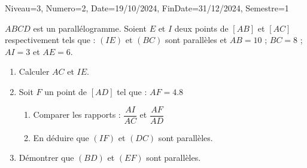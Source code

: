 \documentclass[a4paper,12pt]{article}
\begin{document}
\begin{Maquette}[DM]{Niveau=3, Numero=2, Date=19/10/2024, FinDate=31/12/2024, Semestre=1}
\begin{exercice}
$ABCD$ est un parallélogramme. Soient $E$ et $I$ deux points de $[AB]$ et $[AC]$ respectivement tels que : $(IE)$ et $(BC)$ sont parallèles et $AB=10$ ; $BC=8$ ; $AI=3$ et $AE=6$.
\begin{enumerate}
\item Calculer $AC$ et $IE$.
\item Soit $F$ un point de $[AD]$ tel que : $AF=4.8$
\begin{enumerate}
\item Comparer les rapports : $\dfrac{AI}{AC}$ et $\dfrac{AF}{AD}$
\item En déduire que $(IF)$ et $(DC)$ sont parallèles.
\end{enumerate}
\item Démontrer que $(BD)$ et $(EF)$ sont parallèles.
\end{enumerate} 
\end{exercice}


\end{Maquette}
\end{document}
